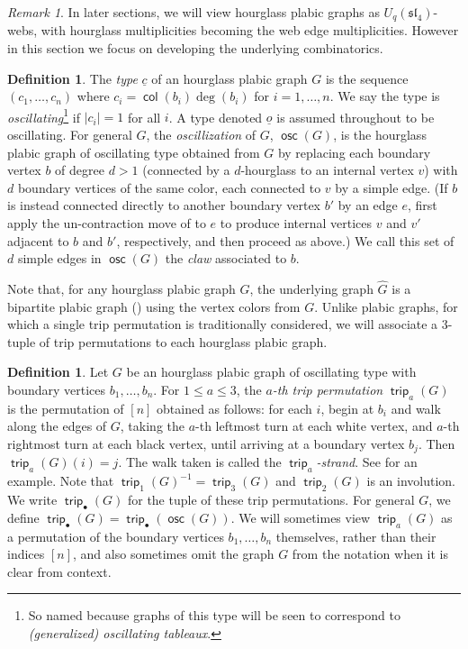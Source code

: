 \documentclass{amsart}
\theoremstyle{definition}
\newtheorem{definition}[theorem]{Definition}
\theoremstyle{remark}
\newtheorem{remark}[theorem]{Remark}
\numberwithin{equation}{section}
\DeclareMathOperator{\trip}{\mathsf{trip}}
\DeclareMathOperator{\col}{\mathsf{col}}
\DeclareMathOperator{\osc}{\mathsf{osc}}
\newcommand{\fsl}{\mathfrak{sl}}
\begin{document}
\begin{remark}
In later sections, we will view hourglass plabic graphs as $U_q(\fsl_4)$-webs, with hourglass multiplicities becoming the web edge multiplicities. However in this section we focus on developing the underlying combinatorics.
\end{remark}

\begin{definition}
\label{def:oscillating-version-of-G}
The \emph{type} $\underline{c}$ of an hourglass plabic graph $G$ is the sequence $(c_1,\ldots,c_n)$ where $c_i=\col(b_i)\deg(b_i)$ for $i=1,\ldots,n$. We say the type is \emph{oscillating}\footnote{So named because graphs of this type will be seen to correspond to \emph{(generalized) oscillating tableaux}.} if $|c_i|=1$ for all $i$. A type denoted $\underline{o}$ is assumed throughout to be oscillating. For general $G$, the \emph{oscillization} of $G$, $\osc(G)$, is the hourglass plabic graph of oscillating type obtained from $G$ by replacing each boundary vertex $b$ of degree $d>1$ (connected by a $d$-hourglass to an internal vertex $v$) with $d$ boundary vertices of the same color, each connected to $v$ by a simple edge. (If $b$ is instead connected directly to another boundary vertex $b'$ by an edge $e$, first apply the un-contraction move of  to $e$ to produce internal vertices $v$ and $v'$ adjacent to $b$ and $b'$, respectively, and then proceed as above.) We call this set of $d$ simple edges in $\osc(G)$ the \emph{claw} associated to $b$.
\end{definition}

Note that, for any hourglass plabic graph $G$, the underlying graph $\widehat{G}$ is a bipartite plabic graph () using the vertex colors from $G$. Unlike plabic graphs, for which a single trip permutation is traditionally considered, we will associate a $3$-tuple of trip permutations to each hourglass plabic graph. 

\begin{definition}\label{def:trip_perms}
Let $G$ be an hourglass plabic graph of oscillating type with boundary vertices $b_1,\ldots, b_n$. For $1 \leq a \leq 3$, the \emph{$a$-th trip permutation} $\trip_a(G)$ is the permutation of $[n]$ obtained as follows: for each $i$, begin at $b_{i}$ and walk along the edges of $G$, taking the $a$-th leftmost turn at each white vertex, and $a$-th rightmost turn at each black vertex, until arriving at a boundary vertex $b_{j}$. Then $\trip_a(G)(i)=j$. The walk taken is called the \emph{$\trip_a$-strand}. See  for an example. Note that $\trip_1(G)^{-1}=\trip_3(G)$ and $\trip_2(G)$ is an involution. We write $\trip_{\bullet}(G)$ for the tuple of these trip permutations. For general $G$, we define $\trip_{\bullet}(G)=\trip_{\bullet}(\osc(G))$. We will sometimes view $\trip_a(G)$ as a permutation of the boundary vertices $b_1,\ldots,b_n$ themselves, rather than their indices $[n]$, and also sometimes omit the graph $G$ from the notation when it is clear from context.
\end{definition}
    
\end{document}
